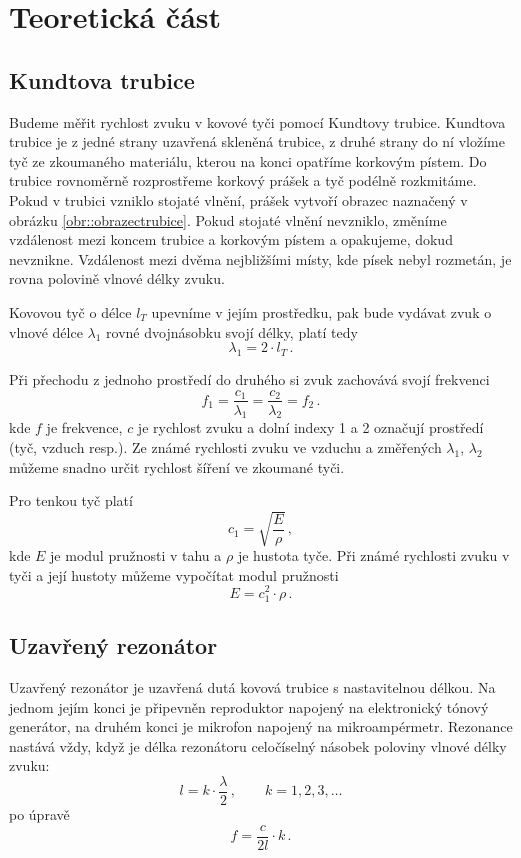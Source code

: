\section*{Teoretická část}
\subsection*{Kundtova trubice}
Budeme měřit rychlost zvuku v kovové tyči pomocí Kundtovy trubice.
Kundtova trubice je z jedné strany uzavřená skleněná trubice, z druhé strany do ní vložíme tyč ze zkoumaného materiálu, kterou na konci opatříme korkovým pístem.
Do trubice rovnoměrně rozprostřeme korkový prášek a tyč podélně rozkmitáme.
Pokud v trubici vzniklo stojaté vlnění, prášek vytvoří obrazec naznačený v obrázku \ref{obr::obrazectrubice}.
Pokud stojaté vlnění nevzniklo, změníme vzdálenost mezi koncem trubice a korkovým pístem a opakujeme, dokud nevznikne.
Vzdálenost mezi dvěma nejbližšími místy, kde písek nebyl rozmetán, je rovna polovině vlnové délky zvuku.


Kovovou tyč o délce $l_T$ upevníme v jejím prostředku, pak bude vydávat zvuk o vlnové délce $\lambda_1$ rovné dvojnásobku svojí délky, platí tedy
\begin{equation}
\lambda_1=2 \cdot l_T  \,.
\end{equation}

Při přechodu z jednoho prostředí do druhého si zvuk zachovává svojí frekvenci
\begin{equation}
f_1= \frac{c_1}{\lambda_1}=\frac{c_2}{\lambda_2}=f_2 \,.
\end{equation}
kde $f$ je frekvence, $c$ je rychlost zvuku a dolní indexy 1 a 2 označují prostředí (tyč, vzduch resp.).
Ze známé rychlosti zvuku ve vzduchu a změřených $\lambda_1$, $\lambda_2$ můžeme snadno určit rychlost šíření ve zkoumané tyči.

Pro tenkou tyč platí \cite{ZFP}
\begin{equation}
c_1 = \sqrt{ \frac{E}{\rho}  } \,,
\end{equation}
kde $E$ je modul pružnosti v tahu a $\rho$ je hustota tyče.
Při známé rychlosti zvuku v tyči a její hustoty můžeme vypočítat modul pružnosti 
\begin{equation}
E=c_1^2 \cdot \rho \,.
\end{equation}

\subsection*{Uzavřený rezonátor}
Uzavřený rezonátor je uzavřená dutá kovová trubice s nastavitelnou délkou.
Na jednom jejím konci je připevněn reproduktor napojený na elektronický tónový generátor, na druhém konci je mikrofon napojený na mikroampérmetr.
Rezonance nastává vždy, když je délka rezonátoru celočíselný násobek poloviny vlnové délky zvuku:
\begin{equation} \label{eq::l_na_k}
l=k \cdot \frac{\lambda}{2} \,,  \qquad  k=1, 2, 3, \ldots
\end{equation}
po úpravě
\begin{equation} \label{eq::f_na_k}
f=\frac{c}{2l} \cdot k \,.
\end{equation}

